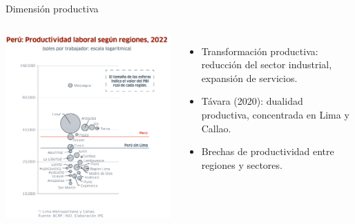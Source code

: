 \documentclass[aspectratio=169]{beamer}
\begin{document}
\begin{frame}{\Large Dimensión productiva}
    \begin{columns}
            \includegraphics[width=\textwidth]{./images/brecha.png} %
            \raggedleft %
            \Large
            \begin{itemize}
                \item Transformación productiva: reducción del sector industrial, expansión de servicios.
                \item Távara (2020): dualidad productiva, concentrada en Lima y Callao.
                \item Brechas de productividad entre regiones y sectores.
            \end{itemize}
    \end{columns}
\end{frame}
\end{document}
